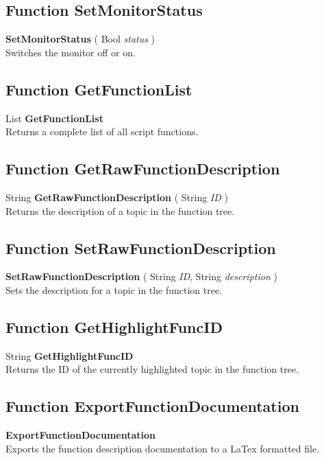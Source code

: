 \documentclass[10pt]{book}
\begin{document}
\subsection{Function SetMonitorStatus \label{F:SetMonitorStatus}}
\textbf{SetMonitorStatus} ( Bool \textit{status} ) \\
Switches the monitor off or on.

\subsection{Function GetFunctionList \label{F:GetFunctionList}}
List \textbf{GetFunctionList} \\
Returns a complete list of all script functions.

\subsection{Function GetRawFunctionDescription \label{F:GetRawFunctionDescription}}
String \textbf{GetRawFunctionDescription} ( String \textit{ID} ) \\
Returns the description of a topic in the function tree.

\subsection{Function SetRawFunctionDescription \label{F:SetRawFunctionDescription}}
\textbf{SetRawFunctionDescription} ( String \textit{ID}, String \textit{description} ) \\
Sets the description for a topic in the function tree.

\subsection{Function GetHighlightFuncID \label{F:GetHighlightFuncID}}
String \textbf{GetHighlightFuncID} \\
Returns the ID of the currently highlighted topic in the function tree.

\subsection{Function ExportFunctionDocumentation \label{F:ExportFunctionDocumentation}}
\textbf{ExportFunctionDocumentation} \\
Exports the function description documentation to a LaTex formatted file.
\end{document}
